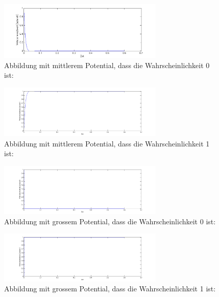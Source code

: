 \begin{refsection}
\begin{figure}
\centering
\includegraphics[width=0.7\textwidth]{flash/graphics/StandardZ0.png}
\caption{Abbildung mit mittlerem Potential, dass die Wahrscheinlichkeit 0 ist:
\label{skript:StandardZ0}}
\end{figure}
\begin{figure}
\centering
\includegraphics[width=0.7\textwidth]{flash/graphics/StandardZ1.png}
\caption{Abbildung mit mittlerem Potential, dass die Wahrscheinlichkeit 1 ist:
\label{skript:StandardZ1}}
\end{figure}

\begin{figure}
\centering
\includegraphics[width=0.7\textwidth]{flash/graphics/PotentialgrossZ0.png}
\caption{Abbildung mit grossem Potential, dass die Wahrscheinlichkeit 0 ist:
\label{skript:PotentialgrossZ0}}
\end{figure}
\begin{figure}
\centering
\includegraphics[width=0.7\textwidth]{flash/graphics/PotentialgrossZ1.png}
\caption{Abbildung mit grossem Potential, dass die Wahrscheinlichkeit 1 ist:
\label{skript:PotentialgrossZ1}}
\end{figure}


\end{refsection}
